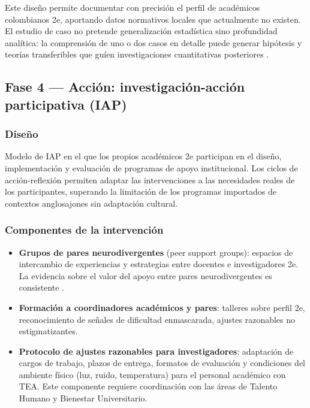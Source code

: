 Este diseño permite documentar con precisión el perfil de académicos colombianos
2e, aportando datos normativos locales que actualmente no existen. El estudio
de caso no pretende generalización estadística sino profundidad analítica:
la comprensión de uno o dos casos en detalle puede generar hipótesis y teorías
transferibles que guíen investigaciones cuantitativas posteriores
\parencite{yin2018}.

\subsection{Fase 4 — Acción: investigación-acción participativa (IAP)}

\subsubsection{Diseño}

Modelo de IAP \parencite{kemmis2014} en el que los propios académicos 2e participan
en el diseño, implementación y evaluación de programas de apoyo institucional.
Los ciclos de acción-reflexión permiten adaptar las intervenciones a las
necesidades reales de los participantes, superando la limitación de los
programas importados de contextos anglosajones sin adaptación cultural.

\subsubsection{Componentes de la intervención}

\begin{itemize}[leftmargin=*, itemsep=2pt]
    \item \textbf{Grupos de pares neurodivergentes} (peer support groups):
    espacios de intercambio de experiencias y estrategias entre docentes e
    investigadores 2e. La evidencia sobre el valor del apoyo entre pares
    neurodivergentes es consistente \parencite{gillespie-lynch2017}.
    \item \textbf{Formación a coordinadores académicos y pares}: talleres
    sobre perfil 2e, reconocimiento de señales de dificultad enmascarada,
    ajustes razonables no estigmatizantes.
    \item \textbf{Protocolo de ajustes razonables para investigadores}: adaptación
    de cargos de trabajo, plazos de entrega, formatos de evaluación y condiciones
    del ambiente físico (luz, ruido, temperatura) para el personal académico con
    TEA. Este componente requiere coordinación con las áreas de Talento Humano
    y Bienestar Universitario.
\end{itemize}

